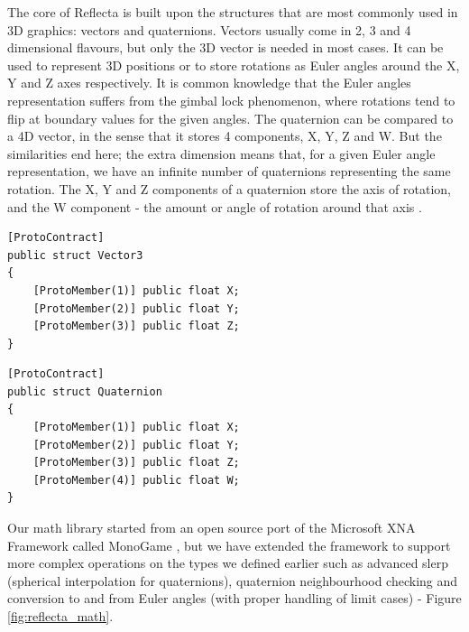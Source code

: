 \documentclass[a4paper, 12pt]{amsart}
\begin{document}
The core of Reflecta is built upon the structures that are most commonly used in 3D graphics: vectors and quaternions. Vectors usually come in 2, 3 and 4 dimensional flavours, but only the 3D vector is needed in most cases. It can be used to represent 3D positions or to store rotations as Euler angles around the X, Y and Z axes respectively. It is common knowledge that the Euler angles representation suffers from the gimbal lock phenomenon, where rotations tend to flip at boundary values for the given angles. The quaternion can be compared to a 4D vector, in the sense that it stores 4 components, X, Y, Z and W. But the similarities end here; the extra dimension means that, for a given Euler angle representation, we have an infinite number of quaternions representing the same rotation. The X, Y and Z components of a quaternion store the axis of rotation, and the W component - the amount or angle of rotation around that axis \cite{bib_quaternions}.

\begin{lstlisting}[basicstyle=\tiny]
[ProtoContract]
public struct Vector3
{
    [ProtoMember(1)] public float X;
    [ProtoMember(2)] public float Y;
    [ProtoMember(3)] public float Z;
}
\end{lstlisting}

\begin{lstlisting}[basicstyle=\tiny]
[ProtoContract]
public struct Quaternion
{
    [ProtoMember(1)] public float X;
    [ProtoMember(2)] public float Y;
    [ProtoMember(3)] public float Z;
    [ProtoMember(4)] public float W;
}
\end{lstlisting}

Our math library started from an open source port of the Microsoft XNA Framework called MonoGame \cite{bib_mono_game}, but we have extended the framework to support more complex operations on the types we defined earlier such as advanced slerp (spherical interpolation for quaternions), quaternion neighbourhood checking and conversion to and from Euler angles (with proper handling of limit cases) - Figure \ref{fig:reflecta_math}.
\end{document}
